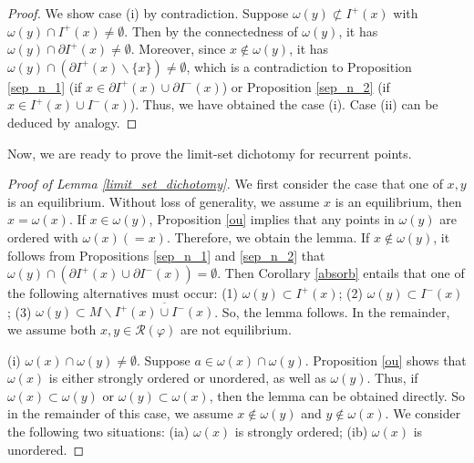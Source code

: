 \documentclass[a4paper,11pt]{article}
\theoremstyle{plain}
\theoremstyle{definition}
\numberwithin{equation}{section}
\begin{document}
	\begin{proof}
		We show case (i) by contradiction. Suppose $\omega(y)\not\subset I^{+}(x)$ with $\omega(y)\cap I^{+}(x)\neq\emptyset$. Then by the connectedness of $\omega(y)$, it has $\omega(y)\cap\partial I^{+}(x)\neq\emptyset$. Moreover, since $x\notin\omega(y)$, it has $\omega(y)\cap(\partial I^{+}(x)\backslash\{x\})\neq\emptyset$, which is a contradiction to Proposition \ref{sep_n_1} (if $x\in \partial I^{+}(x)\cup \partial I^{-}(x)$) or Proposition \ref{sep_n_2} (if $x\in I^{+}(x)\cup I^{-}(x)$). Thus, we have obtained the case (i). Case (ii) can be deduced by analogy.
	\end{proof}

    Now, we are ready to prove the limit-set dichotomy for recurrent points.
	
	\begin{proof}[Proof of Lemma \ref{limit_set_dichotomy}]
    We first consider the case that one of $x,y$ is an equilibrium. Without loss of generality, we assume $x$ is an equilibrium, then $x=\omega(x)$. If $x\in \omega(y)$, Proposition \ref{ou} implies that any points in $\omega(y)$ are ordered with $\omega(x)(=x)$. Therefore, we obtain the lemma.
    If $x\notin \omega(y)$, it follows from Propositions \ref{sep_n_1} and \ref{sep_n_2} that $\omega(y)\cap(\partial I^{+}(x)\cup\partial I^{-}(x))=\emptyset$. Then Corollary \ref{absorb} entails that one of the following alternatives must occur: {\rm (1)} $\omega(y)\subset I^{+}(x)$; {\rm (2)} $\omega(y)\subset I^{-}(x)$; {\rm (3)} $\omega(y)\subset M\backslash \overline{I^{+}(x)\cup I^{-}(x)}$.
    So, the lemma follows. In the remainder, we assume both $x,y\in \mathcal{R}(\varphi)$ are not equilibrium.

	(i) $\omega(x)\cap\omega(y)\neq\emptyset$. Suppose $a\in \omega(x)\cap\omega(y)$. Proposition \ref{ou} shows that $\omega(x)$ is either strongly ordered or unordered, as well as $\omega(y)$. Thus, if $\omega(x)\subset\omega(y)$ or $\omega(y)\subset\omega(x)$, then the lemma can be obtained directly. So in the remainder of this case, we assume $x\notin \omega(y)$ and $y\notin \omega(x)$. We consider the following two situations: (ia) $\omega(x)$ is strongly ordered; (ib) $\omega(x)$ is unordered.


\end{proof}
\end{document}
